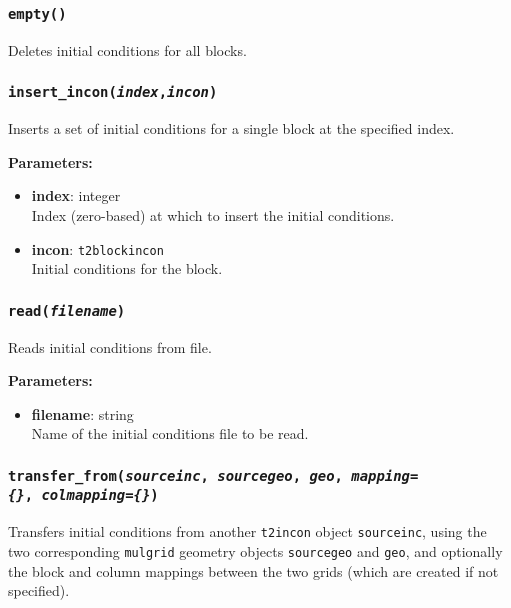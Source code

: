 \subsubsection{\texttt{empty()}}

Deletes initial conditions for all blocks.

\subsubsection{\texttt{insert\_incon(\emph{index},\emph{incon})}}

Inserts a set of initial conditions for a single block at the specified index.

\textbf{Parameters:}
\begin{itemize}
\item \textbf{index}: integer\\
  Index (zero-based) at which to insert the initial conditions.
\item \textbf{incon}: \texttt{t2blockincon}\\
  Initial conditions for the block.
\end{itemize}

\subsubsection{\texttt{read(\emph{filename})}}

Reads initial conditions from file.

\textbf{Parameters:}
\begin{itemize}
\item \textbf{filename}: string\\
  Name of the initial conditions file to be read.
\end{itemize}

\subsubsection{\texttt{transfer\_from(\emph{sourceinc}, \emph{sourcegeo}, \emph{geo}, \emph{mapping=\{\}},\
    \emph{colmapping=\{\}})}}

Transfers initial conditions from another \texttt{t2incon} object \texttt{sourceinc}, using the two corresponding \texttt{mulgrid} geometry objects \texttt{sourcegeo} and \texttt{geo}, and optionally the block and column mappings between the two grids (which are created if not specified).

